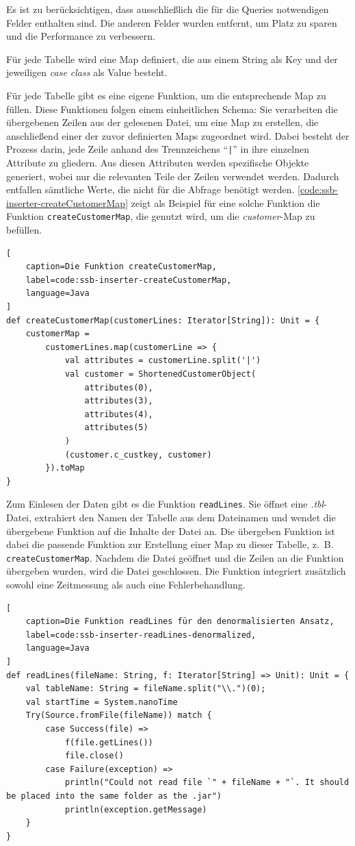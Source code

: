 Es ist zu berücksichtigen, dass ausschließlich die für die Queries notwendigen Felder enthalten sind. Die anderen Felder wurden entfernt, um Platz zu sparen und die Performance zu verbessern.

Für jede Tabelle wird eine Map definiert, die aus einem String als Key und der jeweiligen \emph{case class} als Value besteht.

Für jede Tabelle gibt es eine eigene Funktion, um die entsprechende Map zu füllen. Diese Funktionen folgen einem einheitlichen Schema: Sie verarbeiten die übergebenen Zeilen aus der gelesenen Datei, um eine Map zu erstellen, die anschließend einer der zuvor definierten Maps zugeordnet wird. Dabei besteht der Prozess darin, jede Zeile anhand des Trennzeichens \enquote{\lstinline+|+} in ihre einzelnen Attribute zu gliedern. Aus diesen Attributen werden spezifische Objekte generiert, wobei nur die relevanten Teile der Zeilen verwendet werden. Dadurch entfallen sämtliche Werte, die nicht für die Abfrage benötigt werden. \cref{code:ssb-inserter-createCustomerMap} zeigt als Beispiel für eine solche Funktion die Funktion  \lstinline|createCustomerMap|, die genutzt wird, um die \emph{customer}-Map zu befüllen.

\begin{lstlisting}[
    caption=Die Funktion createCustomerMap,
    label=code:ssb-inserter-createCustomerMap,
    language=Java
]
def createCustomerMap(customerLines: Iterator[String]): Unit = {
	customerMap =
		customerLines.map(customerLine => {
			val attributes = customerLine.split('|')
			val customer = ShortenedCustomerObject(
				attributes(0),
				attributes(3),
				attributes(4),
				attributes(5)
			)
			(customer.c_custkey, customer)
		}).toMap
}
\end{lstlisting}


Zum Einlesen der Daten gibt es die Funktion \lstinline|readLines|. Sie öffnet eine \emph{.tbl}-Datei, extrahiert den Namen der Tabelle aus dem Dateinamen und wendet die übergebene Funktion auf die Inhalte der Datei an. Die übergeben Funktion ist dabei die passende Funktion zur Erstellung einer Map zu dieser Tabelle, z.~B. \lstinline|createCustomerMap|. Nachdem die Datei geöffnet und die Zeilen an die Funktion übergeben wurden, wird die Datei geschlossen. Die Funktion integriert zusätzlich sowohl eine Zeitmessung als auch eine Fehlerbehandlung.

\begin{lstlisting}[
    caption=Die Funktion readLines für den denormalisierten Ansatz,
    label=code:ssb-inserter-readLines-denormalized,
    language=Java
]
def readLines(fileName: String, f: Iterator[String] => Unit): Unit = {
	val tableName: String = fileName.split("\\.")(0);
	val startTime = System.nanoTime
	Try(Source.fromFile(fileName)) match {
		case Success(file) =>
			f(file.getLines())
			file.close()
		case Failure(exception) =>
			println("Could not read file `" + fileName + "`. It should be placed into the same folder as the .jar")
			println(exception.getMessage)
	}
}
\end{lstlisting}

